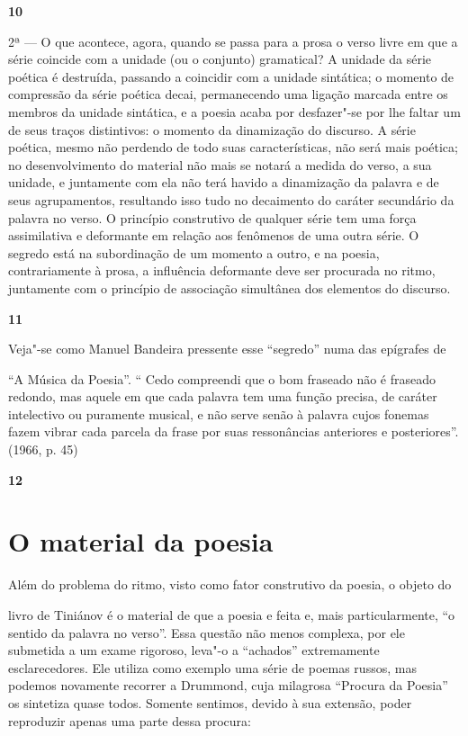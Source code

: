 \textbf{10}

2ª --- O que acontece, agora, quando se passa para a prosa o verso livre
em que a série coincide com a unidade (ou o conjunto) gramatical? A
unidade da série poética é destruída, passando a coincidir com a unidade
sintática; o momento de compressão da série poética decai, permanecendo
uma ligação marcada entre os membros da unidade sintática, e a poesia
acaba por desfazer"-se por lhe faltar um de seus traços distintivos: o
momento da dinamização do discurso. A série poética, mesmo não perdendo
de todo suas características, não será mais poética; no desenvolvimento
do material não mais se notará a medida do verso, a sua unidade, e
juntamente com ela não terá havido a dinamização da palavra e de seus
agrupamentos, resultando isso tudo no decaimento do caráter secundário
da palavra no verso. O princípio construtivo de qualquer série tem uma
força assimilativa e deformante em relação aos fenômenos de uma outra
série. O segredo está na subordinação de um momento a outro, e na
poesia, contrariamente à prosa, a influência deformante deve ser
procurada no ritmo, juntamente com o princípio de associação simultânea
dos elementos do discurso.

\textbf{11}

Veja"-se como Manuel Bandeira pressente esse ``segredo'' numa das
epígrafes de

``A Música da Poesia''. `` Cedo compreendi que o bom fraseado não é
fraseado redondo, mas aquele em que cada palavra tem uma função precisa,
de caráter intelectivo ou puramente musical, e não serve senão à palavra
cujos fonemas fazem vibrar cada parcela da frase por suas ressonâncias
anteriores e posteriores''. (1966, p. 45)

\textbf{12}

\section{O material da poesia}

Além do problema do ritmo, visto como fator construtivo da poesia, o
objeto do

livro de Tiniánov é o material de que a poesia e feita e, mais
particularmente, ``o sentido da palavra no verso''. Essa questão não
menos complexa, por ele submetida a um exame rigoroso, leva"-o a
``achados'' extremamente esclarecedores. Ele utiliza como exemplo uma
série de poemas russos, mas podemos novamente recorrer a Drummond, cuja
milagrosa ``Procura da Poesia'' os sintetiza quase todos. Somente
sentimos, devido à sua extensão, poder reproduzir apenas uma parte dessa
procura:


